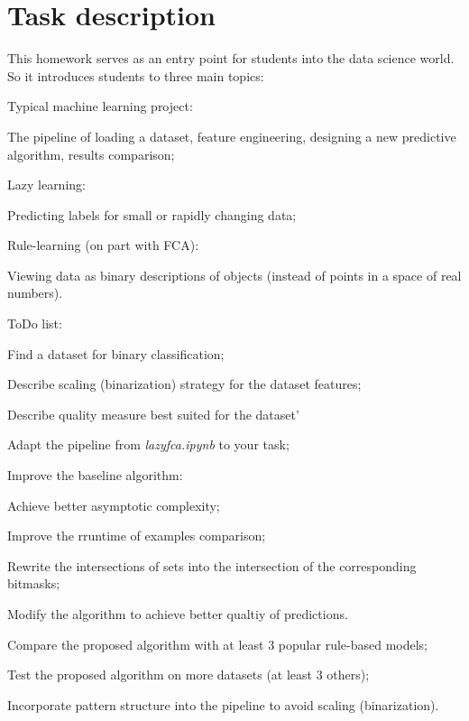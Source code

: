 \documentclass[12pt]{report}
\newcommand{\xmark}{\ding{55}}%
\newcommand{\wontfix}{\rlap{$\square$}{\large\hspace{1pt}\xmark}}
\begin{document}

\boldmath
\tableofcontents
\newpage
\pagestyle{fancy}

\fancyhead[C]{\currentname}

\section{Task description}
This homework serves as an entry point for students into the data science world.
So it introduces students to three main topics:

\begin{enumerate*}
  \item Typical machine learning project:
  \par 
  The pipeline of loading a dataset, feature engineering, designing a new predictive algorithm, results comparison;
  \item Lazy learning:
  \par Predicting labels for small or rapidly changing data;
  \item Rule-learning (on part with FCA):
  \par 
  Viewing data as binary descriptions of objects (instead of points in a space of real numbers).
\end{enumerate*}

{\Large ToDo list}:
\begin{todolist}
  \item[\wontfix] Find a dataset for binary classification;
  \item[\wontfix] Describe scaling (binarization) strategy for the dataset features;
  \item[\wontfix] Describe quality measure best suited for the dataset'
  \item[\wontfix] Adapt the pipeline from \emph{lazyfca.ipynb} to your task;
  \item[\wontfix] Improve the baseline algorithm: 
      \begin{todolist}
          \item[\wontfix] Achieve better asymptotic complexity;
          \item[\wontfix] Improve the rruntime of examples comparison;
          \item[\wontfix] Rewrite the intersections of sets into the intersection of the corresponding bitmasks;
          \item[\wontfix] Modify the algorithm to achieve better qualtiy of predictions.
      \end{todolist}
      \item[\wontfix] Compare the proposed algorithm with at least 3 popular rule-based models;
      \item[\wontfix] Test the proposed algorithm on more datasets (at least 3 others);
      \item Incorporate pattern structure into the pipeline to avoid scaling (binarization).
\end{todolist}
\end{document}
